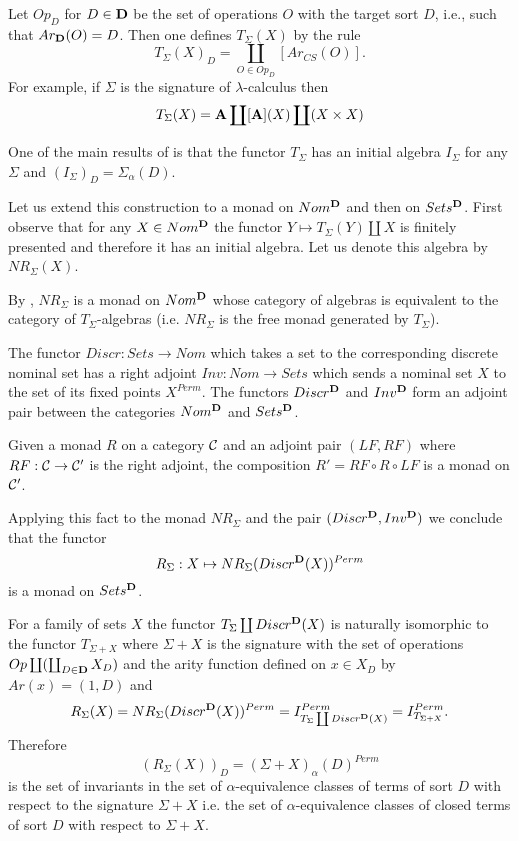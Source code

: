 \documentclass[11pt]{article}
\newcommand{\sr}{\rightarrow}
\begin{document}
{Let $Op_D$ for $D\in {\bf D}$ be the set of operations $O$ with the target sort $D$, i.e., such that $Ar_{\bf D}(O)=D$.  Then one defines $T_{\Sigma}(X)$ by the rule
%
$$T_{\Sigma}(X)_D=\coprod_{O\in Op_D} [Ar_{CS}(O)].$$
%
For example, if $\Sigma$ is the signature of $\lambda$-calculus then 
%
$$T_{\Sigma}(X)={\bf A}\coprod [{\bf A}](X)\coprod (X\times X)$$
%

One of the main results of \cite{Pitts} is that the functor $T_{\Sigma}$ has an initial algebra $I_{\Sigma}$ for any $\Sigma$ and $(I_{\Sigma})_D=\Sigma_{\alpha}(D)$. 

Let us extend this construction to a monad on $Nom^{\bf D}$ and then on $Sets^{\bf D}$. First observe that for any $X\in Nom^{\bf D}$ the functor $Y\mapsto T_{\Sigma}(Y)\coprod X$ is finitely presented and therefore it has an initial algebra. Let us denote this algebra by $NR_{\Sigma}(X)$. 

By \cite[pp. 243-244]{Awodey2010}, $NR_{\Sigma}$ is a monad on $Nom^{\bf D}$ whose category of algebras is equivalent to the category of $T_{\Sigma}$-algebras (i.e. $NR_{\Sigma}$ is the free monad generated by $T_{\Sigma}$).

The functor $Discr:Sets \sr Nom$ which takes a set to the corresponding discrete nominal set has a right adjoint $Inv:Nom\sr Sets$ which sends a nominal set $X$ to the set of its fixed points $X^{Perm}$. The functors $Discr^{\bf D}$ and $Inv^{\bf D}$ form an adjoint pair between the categories $Nom^{\bf D}$ and $Sets^{\bf D}$.

Given a monad $R$ on a category $\cal C$ and an adjoint pair $(LF,RF)$ where $RF:{\cal C}\sr{\cal C}'$ is the right adjoint, the composition $R'=RF\circ R\circ LF$ is a monad on ${\cal C}'$.

Applying this fact to the monad $NR_{\Sigma}$ and the pair $(Discr^{\bf D},Inv^{\bf D})$ we conclude that the functor 
%
$$R_{\Sigma}:X\mapsto NR_{\Sigma}(Discr^{\bf D}(X))^{Perm}$$
% 
is a monad on $Sets^{\bf D}$.

For a family of sets $X$ the functor $T_{\Sigma}\coprod Discr^{\bf D}(X)$ is naturally isomorphic to the functor $T_{\Sigma+X}$ where $\Sigma+X$ is the signature with the set of operations $Op\coprod (\coprod_{D\in {\bf D}} X_D)$ and the arity function defined on $x\in X_D$ by $Ar(x)=(1,D)$ and
%
$$R_{\Sigma}(X)=NR_{\Sigma}(Discr^{\bf D}(X))^{Perm}=I_{T_{\Sigma}\coprod Discr^{\bf D}(X)}^{Perm}=I_{T_{\Sigma+X}}^{Perm}.$$
%
Therefore
%
$$(R_{\Sigma}(X))_D=(\Sigma+X)_{\alpha}(D)^{Perm}$$
%
is the set of invariants in the set of $\alpha$-equivalence classes of terms of sort $D$ with respect to the signature $\Sigma+X$ i.e. the set of $\alpha$-equivalence classes of closed terms of sort $D$ with respect to $\Sigma+X$. 

}
\end{document}
